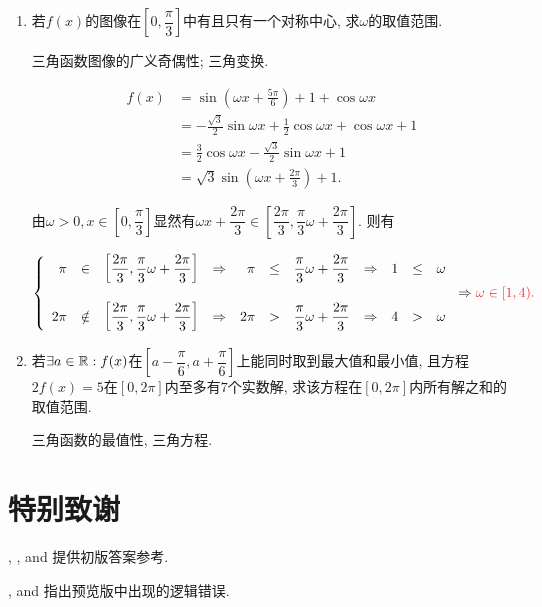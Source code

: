 \documentclass[8pt]{article}
\begin{document}
			\begin{enumerate}[label=\defmath{(\arabic*)}]
				\item 若\(f(x)\)的图像在\(\left[0, \dfrac{\pi}{3}\right]\)中有且只有一个对称中心, 求\(\omega\)的取值范围. \answord{\(\omega \in [1, 4).\)}

					三角函数图像的广义奇偶性; 三角变换.

					\begin{align*}
						f(x) &= \sin \left(\omega x + \frac{5\pi}{6}\right) + 1 + \cos\omega x\\
						     &= -\frac{\sqrt{3}}{2} \sin \omega x + \frac{1}{2} \cos \omega x + \cos \omega x + 1\\
						     &= \frac{3}{2} \cos \omega x - \frac{\sqrt{3}}{2} \sin \omega x + 1\\
						     &= \sqrt{3} \sin \left(\omega x + \frac{2\pi}{3}\right) + 1.
					\end{align*}

					由\(\omega > 0, x \in \left [0, \dfrac{\pi}{3}\right]\)显然有\(\omega x + \dfrac{2\pi}{3} \in \left[\dfrac{2\pi}{3}, \dfrac{\pi}{3} \omega + \dfrac{2\pi}{3}\right]\). 则有

					\[
						\left\{
							\begin{array}{rclcrclcrcl}
								\pi & \in & \left[\dfrac{2\pi}{3}, \dfrac{\pi}{3} \omega + \dfrac{2\pi}{3}\right] & \Rightarrow & \pi & \leq & \dfrac{\pi}{3} \omega + \dfrac{2\pi}{3} & \Rightarrow & 1 & \leq & \omega\\\\
								2\pi & \notin & \left[\dfrac{2\pi}{3}, \dfrac{\pi}{3} \omega + \dfrac{2\pi}{3}\right] & \Rightarrow & 2\pi & > & \dfrac{\pi}{3}\omega + \dfrac{2\pi}{3} & \Rightarrow & 4 & > & \omega\\
							\end{array}
						\right.
						\Rightarrow
						\ansmath{\omega \in [1, 4).}
					\]

				\item 若\(\exists a \in \mathbb{R}: f(x)\)在\(\left[a - \dfrac{\pi}{6}, a + \dfrac{\pi}{6} \right]\)上能同时取到最大值和最小值, 且方程\(2f(x)=5\)在\([0, 2\pi]\)内至多有\(7\)个实数解, 求该方程在\([0, 2\pi]\)内所有解之和的取值范围.

					三角函数的最值性, 三角方程.

			\end{enumerate}

	\section{特别致谢}
		, , and 提供初版答案参考.

		, and 指出预览版中出现的逻辑错误.
\end{document}

